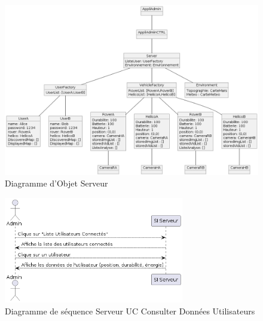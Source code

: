 \documentclass[12pt,a4paper]{scrartcl}
\begin{document}
\begin{figure}[p]
    \centering
    \includegraphics[width=1\textwidth]{Diag_Obj_Admin.png}
    \caption{Diagramme d'Objet Serveur}\label{obj_serv}
\end{figure}

\begin{figure}[p]
    \centering
    \includegraphics[width=0.7\textwidth]{diag_seq_admin_consulter.png}
    \caption{Diagramme de séquence Serveur UC Consulter Données Utilisateurs }\label{seq1_serv}
\end{figure}
\end{document}
